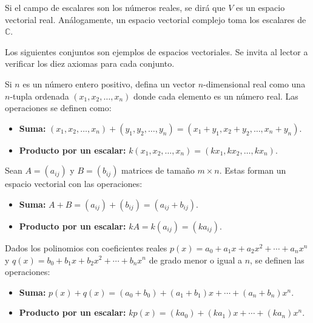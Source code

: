 \begin{rem} 
Si el campo de escalares son los números reales, se dirá que $V$ es un espacio vectorial real. Análogamente, un espacio vectorial complejo toma los escalares de $\mathbb{C}$. 
\end{rem}

Los siguientes conjuntos son ejemplos de espacios vectoriales. Se invita al lector a verificar los diez axiomas para cada conjunto.

\begin{example}  
Si $n$ es un número entero positivo, defina un vector $n$-dimensional real como una $n$-tupla ordenada $(x_1,x_2,\dots, x_n)$ donde cada elemento es un número real. Las operaciones se definen como:
\begin{itemize}
\item \textbf{Suma:} $(x_1,x_2,\dots,x_n)+(y_1,y_2,\dots,y_n)=(x_1+y_1,x_2+y_2,\ldots,x_n+y_n)$.
\item \textbf{Producto por un escalar:} $k(x_1,x_2,\dots,x_n)=(kx_1,kx_2,\dots,kx_n)$.
\end{itemize}  
\end{example}

\begin{example}
Sean $A=\left(a_{ij}\right)$ y $B=\left(b_{ij}\right)$ matrices de tamaño $m\times n$. Estas forman un espacio vectorial con las operaciones: 
\begin{itemize}
\item \textbf{Suma:} $A+B=(a_{ij})+(b_{ij})=(a_{ij}+b_{ij})$.
\item \textbf{Producto por un escalar:} $kA=k(a_{ij})=(ka_{ij})$.
\end{itemize} 
\end{example}

\begin{example}
Dados los polinomios con coeficientes reales $p(x)=a_0+a_1x+a_2x^2+\cdots + a_nx^n$ y $q(x)=b_0+b_1x+b_2x^2+\cdots + b_nx^n$ de grado menor o igual a $n$, se definen las operaciones:
\begin{itemize}
\item \textbf{Suma:} $p(x)+q(x)=(a_0+b_0)+(a_1+b_1)x+\cdots + (a_n+b_n)x^n$.
\item \textbf{Producto por un escalar:} $kp(x)=(ka_0)+(ka_1)x+\cdots + (ka_n)x^n$.
\end{itemize} 
\end{example}

